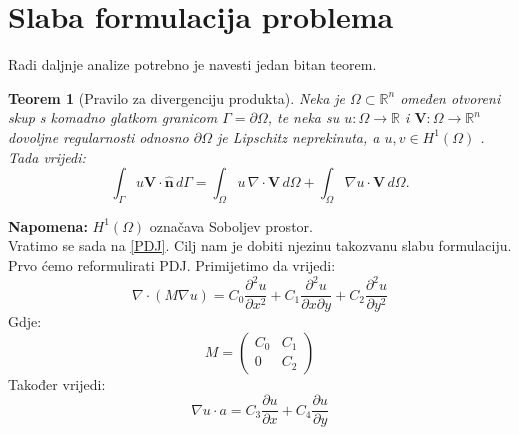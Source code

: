 \documentclass[zavrsnirad]{../fer}
\newtheorem{teorem}{Teorem}
\begin{document}
\section{Slaba formulacija problema}
\label{slabaFormulacija}
Radi daljnje analize potrebno je navesti jedan bitan 
teorem.
\\ 
\begin{teorem}[Pravilo za divergenciju produkta]
\label{tm1}
Neka je $\Omega \subset \mathbb{R}^n$ omeđen otvoreni
skup s komadno glatkom granicom $\Gamma = \partial \Omega$,
te neka su $u : \Omega \to \mathbb{R}$ i $\mathbf{V} : \Omega \to \mathbb{R}^n$ 
dovoljne regularnosti odnosno $\partial \Omega$ je
Lipschitz neprekinuta, a $u,v \in H^1(\Omega)$
. Tada vrijedi:
\[
\int_{\Gamma} u \mathbf{V} \cdot \hat{\mathbf{n}} \, d\Gamma = 
\int_{\Omega} u \, \nabla \cdot \mathbf{V} \, d\Omega + 
\int_{\Omega} \nabla u \cdot \mathbf{V} \, d\Omega.
\]
\end{teorem}
\textbf{Napomena:} $H^1(\Omega)$ označava Soboljev prostor.
\bigskip
\\ 
Vratimo se sada na \ref{PDJ}.
Cilj nam je dobiti njezinu takozvanu slabu formulaciju.
Prvo ćemo reformulirati PDJ. Primijetimo da vrijedi:
$$\nabla \cdot (M \nabla u) = 
  C_0 \frac{\partial^2 u}{\partial x^2}
	+ C_1 \frac{\partial^2 u}{\partial x \partial y}
	+ C_2 \frac{\partial^2 u}{\partial y^2}
$$
Gdje:
$$M = 
\begin{pmatrix}
  C_0 & C_1 \\ 
  0 & C_2
\end{pmatrix}
 $$
 Također vrijedi:
 $$ \nabla u \cdot a =
 C_3 \frac{\partial u}{\partial x}
	+ C_4 \frac{\partial u}{\partial y} $$
\end{document}
